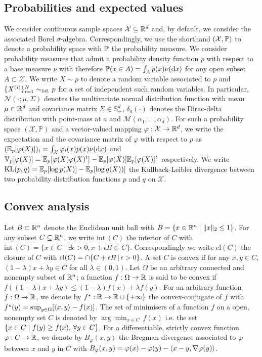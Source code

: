\subsection*{Probabilities and expected values}
We consider continuous sample spaces $\mathcal X\subseteq \R^{d}$ and, by default, we consider the associated Borel $\sigma$-algebra. 
Correspondingly, we use the shorthand $(\mathcal X,\P)$ to denote a probability space with $\P$ the probability measure. 
We consider probability measures that admit a probability density function $p$ with respect to a base measure $\nu$ with therefore $\P(x\in A)=\int_{A}p(x)\nudx$ for any open subset $A\subset \mathcal X$. We write $X\sim p$ to denote a random variable associated to $p$ and $\{X^{(i)}\}_{i=1}^{N}\simiid p$ for a set of independent such random variables.
In particular, $\mathcal N(\cdot; \mu,\Sigma)$ denotes the multivariate normal distribution function with mean $\mu\in \R^{d}$ and covariance matrix $\Sigma\in\mathbb S^{d}_+$, $\delta_a(\cdot)$ denotes the Dirac-delta distribution with point-mass at $a$ and $\mathcal M(\alpha_{1},\dots,\alpha_{d})$.
For such a probability space $(\mathcal X, \mathbb P)$ and a vector-valued mapping $\varphi:\mathcal X\to\R^{d}$, we write the expectation and the covariance matrix of $\varphi$ with respect to $p$ as $(\E_{p}[\varphi(X)])_{i}=\int_{\mathcal X}\varphi_{i}(x)p(x)\nudx$ and $\V_{p}[\varphi(X)]=\E_{p}[\varphi(X)\varphi(X)^{t}]-\E_{p}[\varphi(X)]\E_{p}[\varphi(X)]^{t}$ respectively. 
We write $\KL{p,q}=\E_{p}[\log p(X)]-\E_{p}[\log q(X))]$ the Kullback-Leibler divergence between two probability distribution functions $p$ and $q$ on $\mathcal X$. 
%

\subsection*{Convex analysis}
Let $B\subset\R^{n}$ denote the Euclidean unit ball with $B=\{x\in\R^{n}\mid \|x\|_{2}\le 1\}$. For any subset $C\subseteq\R^{n}$, we write $\mathrm{int}\,(C)$ the interior of $C$ with $\mathrm{int}\,(C)=\{x\in C \mid \exists \epsilon>0, x+\epsilon B \subset C\}$. Correspondingly we write $\mathrm{cl}(C)$ the closure of $C$ with $\mathrm{cl}(C) = \cap\{C+\epsilon B\st \epsilon>0\}$. A set $C$ is convex if for any $x,y\in C$, $(1-\lambda)x+\lambda y\in C$ for all $\lambda\in(0,1)$. Let $\Omega$ be an arbitrary connected and nonempty subset of $\R^{n}$; a function $f:\Omega\to\R$ is said to be convex if $f((1-\lambda)x+\lambda y)\le (1-\lambda)f(x)+\lambda f(y)$. For an arbitrary function $f:\Omega\to\R$, we denote by $f^{\star}:\R\to \R\cup\{+\infty\}$ the convex-conjugate of $f$ with $f^{\star}(y)=\sup_{y\in \Omega}[\scal{x,y}-f(x)]$. The set of minimisers of a function $f$ on a open, nonempty set $C$ is denoted by $\arg\min_{x\in C}\,f(x)$ i.e. the set $\pab{x\in C\mid f(y)\ge f(x), \,\forall y\in C}$. For a differentiable, strictly convex function $\varphi:C\to\R$, we denote by $B_\varphi(x,y)$ the Bregman divergence associated to $\varphi$ between $x$ and $y$ in $C$ with $B_\varphi(x,y)=\varphi(x)-\varphi(y)-\scal{x-y,\nabla \varphi(y)}$.  

